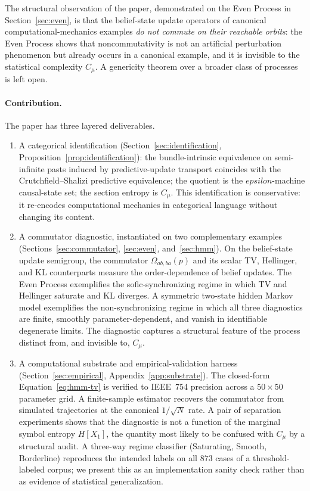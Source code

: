 \documentclass[11pt,a4paper]{article}
\def\varepsilon{epsilon}%
\theoremstyle{plain}
\theoremstyle{definition}
\theoremstyle{remark}
\begin{document}
The structural observation of the paper, demonstrated on the Even Process in Section~\ref{sec:even}, is that the belief-state update operators of canonical computational-mechanics examples \emph{do not commute on their reachable orbits}: the Even Process shows that noncommutativity is not an artificial perturbation phenomenon but already occurs in a canonical example, and it is invisible to the statistical complexity $C_\mu$. A genericity theorem over a broader class of processes is left open.

\paragraph{Contribution.} The paper has three layered deliverables.
\begin{enumerate}[label=(\arabic*)]
    \item A categorical identification (Section~\ref{sec:identification}, Proposition~\ref{prop:identification}): the bundle-intrinsic equivalence on semi-infinite pasts induced by predictive-update transport coincides with the Crutchfield--Shalizi predictive equivalence; the quotient is the $\varepsilon$-machine causal-state set; the section entropy is $C_\mu$. This identification is conservative: it re-encodes computational mechanics in categorical language without changing its content.
    \item A commutator diagnostic, instantiated on two complementary examples (Sections~\ref{sec:commutator}, \ref{sec:even}, and~\ref{sec:hmm}). On the belief-state update semigroup, the commutator $\Omega_{ab,ba}(p)$ and its scalar TV, Hellinger, and KL counterparts measure the order-dependence of belief updates. The Even Process exemplifies the sofic-synchronizing regime in which TV and Hellinger saturate and KL diverges. A symmetric two-state hidden Markov model exemplifies the non-synchronizing regime in which all three diagnostics are finite, smoothly parameter-dependent, and vanish in identifiable degenerate limits. The diagnostic captures a structural feature of the process distinct from, and invisible to, $C_\mu$.
    \item A computational substrate and empirical-validation harness (Section~\ref{sec:empirical}, Appendix~\ref{app:substrate}). The closed-form Equation~\eqref{eq:hmm-tv} is verified to IEEE~754 precision across a $50 \times 50$ parameter grid. A finite-sample estimator recovers the commutator from simulated trajectories at the canonical $1/\sqrt{N}$ rate. A pair of separation experiments shows that the diagnostic is not a function of the marginal symbol entropy $H[X_1]$, the quantity most likely to be confused with $C_\mu$ by a structural audit. A three-way regime classifier (Saturating, Smooth, Borderline) reproduces the intended labels on all $873$ cases of a threshold-labeled corpus; we present this as an implementation sanity check rather than as evidence of statistical generalization.
\end{enumerate}
\end{document}
